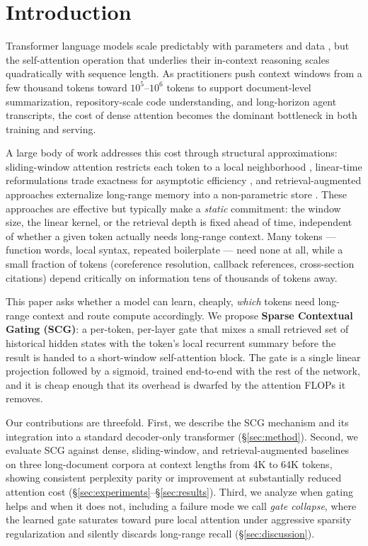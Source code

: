 \section{Introduction}
\label{sec:intro}

Transformer language models scale predictably with parameters and data
\cite{winslow2022scaling}, but the self-attention operation that underlies
their in-context reasoning scales quadratically with sequence length. As
practitioners push context windows from a few thousand tokens toward
$10^5$--$10^6$ tokens to support document-level summarization, repository-scale
code understanding, and long-horizon agent transcripts, the cost of dense
attention becomes the dominant bottleneck in both training and serving.

A large body of work addresses this cost through structural approximations:
sliding-window attention restricts each token to a local neighborhood
\cite{brantley2021sliding}, linear-time reformulations trade exactness for
asymptotic efficiency \cite{ferro2020longformer}, and retrieval-augmented
approaches externalize long-range memory into a non-parametric store
\cite{park2022retrieval}. These approaches are effective but typically make a
\emph{static} commitment: the window size, the linear kernel, or the retrieval
depth is fixed ahead of time, independent of whether a given token actually
needs long-range context. Many tokens --- function words, local syntax,
repeated boilerplate --- need none at all, while a small fraction of tokens
(coreference resolution, callback references, cross-section citations)
depend critically on information tens of thousands of tokens away.

This paper asks whether a model can learn, cheaply, \emph{which} tokens need
long-range context and route compute accordingly. We propose \textbf{Sparse
Contextual Gating (SCG)}: a per-token, per-layer gate that mixes a small
retrieved set of historical hidden states with the token's local recurrent
summary before the result is handed to a short-window self-attention block.
The gate is a single linear projection followed by a sigmoid, trained
end-to-end with the rest of the network, and it is cheap enough that its
overhead is dwarfed by the attention FLOPs it removes.

Our contributions are threefold. First, we describe the SCG mechanism and its
integration into a standard decoder-only transformer (\S\ref{sec:method}).
Second, we evaluate SCG against dense, sliding-window, and retrieval-augmented
baselines on three long-document corpora at context lengths from 4K to 64K
tokens, showing consistent perplexity parity or improvement at substantially
reduced attention cost (\S\ref{sec:experiments}--\S\ref{sec:results}).
Third, we analyze when gating helps and when it does not, including a
failure mode we call \emph{gate collapse}, where the learned gate saturates
toward pure local attention under aggressive sparsity regularization and
silently discards long-range recall (\S\ref{sec:discussion}).
